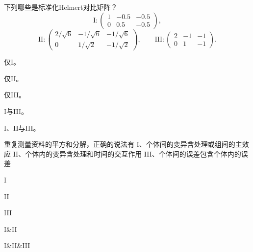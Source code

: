 \par\addvspace{6pt}\noindent\begin{minipage}{\linewidth}


下列哪些是标准化Helmert对比矩阵？ \[\mathrm{I}:\begin{pmatrix}1&-0.5&-0.5\\0&0.5&-0.5\end{pmatrix},\] \[\mathrm{II}:\begin{pmatrix}2/\sqrt6&-1/\sqrt6&-1/\sqrt6\\0&1/\sqrt2&-1/\sqrt2\end{pmatrix},\qquad
\mathrm{III}:\begin{pmatrix}2&-1&-1\\0&1&-1\end{pmatrix}.\]


\begin{choices}

\item 仅I。

\item 仅II。

\item 仅III。

\item I与III。

\item I、II与III。

\end{choices}

\end{minipage}\par\vspace{4pt}

\par\addvspace{6pt}\noindent\begin{minipage}{\linewidth}


重复测量资料的平方和分解，正确的说法有 I、个体间的变异含处理或组间的主效应 II、个体内的变异含处理和时间的交互作用 III、个体间的误差包含个体内的误差


\begin{choices}

\item I

\item II

\item III

\item I\&II

\item I\&II\&III

\end{choices}

\end{minipage}\par\vspace{4pt}


